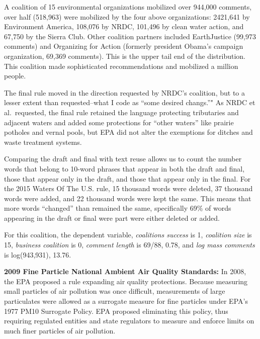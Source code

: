\documentclass[
      12pt,
        ]{article}
\begin{document}
A coalition of 15 environmental organizations mobilized over 944,000 comments, over half (518,963) were mobilized by the four above organizations: 2421,641 by Environment America, 108,076 by NRDC, 101,496 by clean water action, and 67,750 by the Sierra Club. Other coalition partners included EarthJustice (99,973 comments) and Organizing for Action (formerly president Obama's campaign organization, 69,369 comments). This is the upper tail end of the distribution. This coalition made sophisticated recommendations and mobilized a million people.

The final rule moved in the direction requested by NRDC's coalition, but to a lesser extent than requested--what I code as ``some desired changs.''" As NRDC et al.~requested, the final rule retained the language protecting tributaries and adjacent waters and added some protections for ``other waters'' like prairie potholes and vernal pools, but EPA did not alter the exemptions for ditches and waste treatment systems.

Comparing the draft and final with text reuse allows us to count the number words that belong to 10-word phrases that appear in both the draft and final, those that appear only in the draft, and those that appear only in the final. For the 2015 Waters Of The U.S. rule, 15 thousand words were deleted, 37 thousand words were added, and 22 thousand words were kept the same. This means that more words ``changed'' than remained the same, specifically 69\% of words appearing in the draft or final were part were either deleted or added.

For this coalition, the dependent variable, \emph{coalitions success} is 1, \emph{coalition size} is 15, \emph{business coalition} is 0, \emph{comment length} is 69/88, 0.78, and \emph{log mass comments} is log(943,931), 13.76.

\textbf{2009 Fine Particle National Ambient Air Quality Standards:} In 2008, the EPA proposed a rule expanding air quality protections. Because measuring small particles of air pollution was once difficult, measurements of large particulates were allowed as a surrogate measure for fine particles under EPA's 1977 PM10 Surrogate Policy. EPA proposed eliminating this policy, thus requiring regulated entities and state regulators to measure and enforce limits on much finer particles of air pollution.
\end{document}

